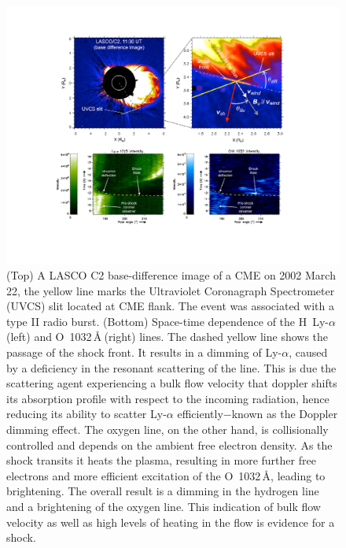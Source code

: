\begin{figure}[t!]
\begin{center}
\includegraphics[trim=4.5cm 3cm 0cm 3cm, scale=0.75]{images/mancuso_uvcs.pdf}
\caption[CME flank shock observed by the UVCS spectrometer]{(Top) A LASCO C2 base-difference image of a CME on 2002 March 22, the yellow line marks the Ultraviolet Coronagraph Spectrometer (UVCS) slit located at CME flank. The event was associated with a type II radio burst. (Bottom) Space-time dependence of the H\, Ly-$\alpha$ (left) and O\, 1032\,\AA$~$(right) lines. The dashed yellow line shows the passage of the shock front. It results in a dimming of Ly-$\alpha$, caused by a deficiency in the resonant scattering of the line. This is due the scattering agent experiencing a bulk flow velocity that doppler shifts its absorption profile with respect to the incoming radiation, hence reducing its ability to scatter Ly-$\alpha$ efficiently$-$known as the Doppler dimming effect. The oxygen line, on the other hand, is collisionally controlled and depends on the ambient free electron density. As the shock transits it heats the plasma, resulting in more further free electrons and more efficient excitation of the O\, 1032\,\AA, leading to brightening. The overall result is a dimming in the hydrogen line and a brightening of the oxygen line. This indication of bulk flow velocity as well as high levels of heating in the flow is evidence for a shock.}
\label{fig:mancuso_uv}
\end{center}
\end{figure}
